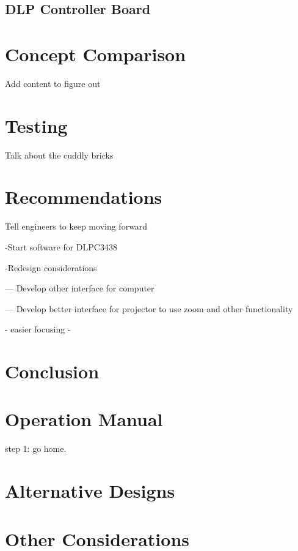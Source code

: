 \documentclass[12pt,a4paper]{article}
\begin{document}
\subsection{DLP Controller Board}








\section{Concept Comparison}

Add content to figure out

\section{Testing}
Talk about the cuddly bricks



\section{Recommendations}

Tell engineers to keep moving forward

-Start software for DLPC3438

-Redesign considerations

	 --- Develop other interface for computer
	 
	 --- Develop better interface for projector to use
	  zoom and other functionality
	  
	  
	 

- easier focusing
- 



\section{Conclusion}






\begin{appendices}

\section{Operation Manual}


step 1: go home.

\section{Alternative Designs}



\section{Other Considerations}


\end{appendices}
\end{document}
